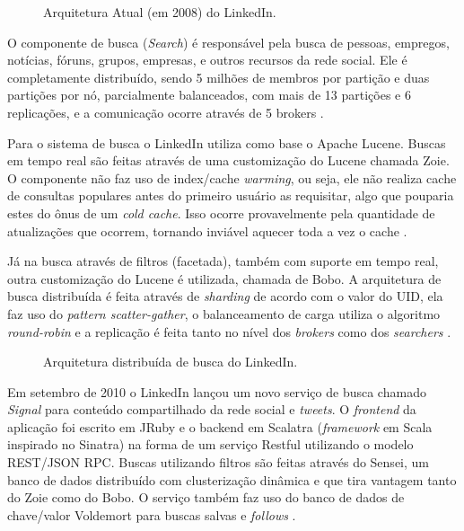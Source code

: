 \documentclass[diss]{template/setrem}
\begin{document}
\begin{figure}[!h]
    \caption{Arquitetura Atual (em 2008) do LinkedIn.}
    \label{fig:linkedin-today-architecture}
\end{figure}

O componente de busca (\emph{Search}) é responsável pela busca de pessoas, empregos, notícias, fóruns, grupos, empresas, e outros recursos da rede social. Ele é completamente distribuído, sendo 5 milhões de membros por partição e duas partições por nó, parcialmente balanceados, com mais de 13 partições e 6 replicações, e a comunicação ocorre através de 5 brokers \citep{Wang2010}.

Para o sistema de busca o LinkedIn utiliza como base o Apache Lucene. Buscas em tempo real são feitas através de uma customização do Lucene chamada Zoie. O componente não faz uso de index/cache \emph{warming}, ou seja, ele não realiza cache de consultas populares antes do primeiro usuário as requisitar, algo que pouparia estes do ônus de um \emph{cold cache}. Isso ocorre provavelmente pela quantidade de atualizações que ocorrem, tornando inviável aquecer toda a vez o cache \citep{Wang2010}.

Já na busca através de filtros (facetada), também com suporte em tempo real, outra customização do Lucene é utilizada, chamada de Bobo. A arquitetura de busca distribuída é feita através de \emph{sharding} de acordo com o valor do UID, ela faz uso do \emph{pattern scatter-gather}, o balanceamento de carga utiliza o algoritmo \emph{round-robin} e a replicação é feita tanto no nível dos \emph{brokers} como dos \emph{searchers} \citep{Wang2010}.

\begin{figure}[!h]
    \caption{Arquitetura distribuída de busca do LinkedIn.}
    \label{fig:linkedin-search-architecture}
\end{figure}

Em setembro de 2010 o LinkedIn lançou um novo serviço de busca chamado \emph{Signal} para conteúdo compartilhado da rede social e \emph{tweets}. O \emph{frontend} da aplicação foi escrito em JRuby e o backend em Scalatra (\emph{framework} em Scala inspirado no Sinatra) na forma de um serviço Restful utilizando o modelo REST/JSON RPC. Buscas utilizando filtros são feitas através do Sensei, um banco de dados distribuído com clusterização dinâmica e que tira vantagem tanto do Zoie como do Bobo. O serviço também faz uso do banco de dados de chave/valor Voldemort para buscas salvas e \emph{follows} \citep{Wang2010a}.
\end{document}
